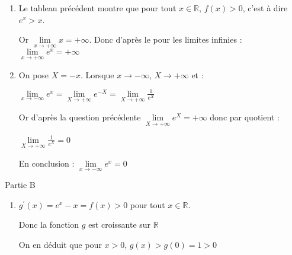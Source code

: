 \begin{corrige}
\begin{enumerate}
\begin{center}
\begin{extern}
{
      }
   \end{extern}
\end{center}
\item
          Le tableau précédent montre que pour tout $x \in  \mathbb{R}$, $f\left(x\right) > 0$, c'est à dire $e^{x} > x$.
          \par
          Or $\lim\limits_{x\rightarrow +\infty }x=+\infty $. Donc d'après le   pour les limites infinies : $\lim\limits_{x\rightarrow +\infty }e^{x}=+\infty $
          \item
          On pose $X=-x$. Lorsque $x\rightarrow -\infty $, $X\rightarrow +\infty $ et :
          \par
          $\lim\limits_{x\rightarrow -\infty }e^{x}=\lim\limits_{X\rightarrow +\infty }e^{-X}=\lim\limits_{X\rightarrow +\infty }\frac{1}{e^{X}}$
          \par
          Or d'après la question précédente $\lim\limits_{X\rightarrow +\infty }e^{X}=+\infty $ donc par quotient :
          \par
          $\lim\limits_{X\rightarrow +\infty }\frac{1}{e^{X}}=0$
          \par
          En conclusion :  $\lim\limits_{x\rightarrow -\infty }e^{x}=0$
     \end{enumerate}
     \begin{h3}Partie B\end{h3}
     \begin{enumerate}
          \item
          $g^{\prime}\left(x\right)=e^{x}-x=f\left(x\right) > 0$ pour tout $x \in  \mathbb{R}$.
          \par
          Donc la fonction $g$ est croissante sur $\mathbb{R}$
          \par
          On en déduit que pour $x > 0$, $g\left(x\right) > g\left(0\right)=1 > 0$

\end{enumerate}
\end{corrige}
